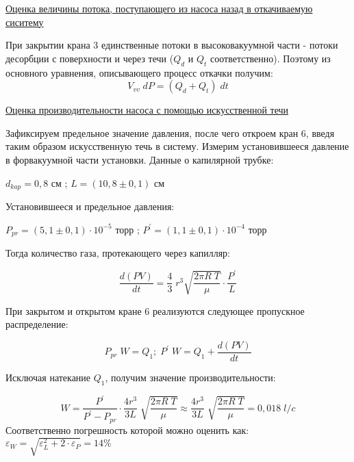 \documentclass{article}
\begin{document}
\begin{center}
    \raggedleft
    {
        \large{\underline{Оценка величины потока, поступающего из насоса назад в откачиваемую сиситему}}
    }
\end{center}

При закрытии крана 3 единственные потоки в высоковакуумной части - потоки десорбции с поверхности и через течи (\(Q_{d}\) и \(Q_{t}\) соответственно). Поэтому из основного уравнения, описывающего процесс откачки получим:
\begin{equation}
    V_{vv}\;dP = (Q_{d} + Q_{t})\;dt
\end{equation}

\begin{center}
    \raggedleft
    {
        \large{\underline{Оценка производительности насоса с помощью искусственной течи}}
    }
\end{center}

Зафиксируем предельное значение давления, после чего откроем кран 6, введя таким образом искусственную течь в систему. Измерим установившееся давление в форвакуумной части установки. Данные о капилярной трубке:

\begin{center}
    \(d_{kap} = 0,8\) см ; \; \(L = (10,8 \pm 0,1)\) см
\end{center}

Установившееся и предельное давления:

\begin{center}
    \(P_{pr} = (5,1 \pm 0,1) \cdot 10^{-5}\) торр ; \; \(P^{'} = (1,1 \pm 0,1) \cdot 10^{-4}\) торр
\end{center}

Тогда количество газа, протекающего через капилляр:

\begin{equation}
    \frac{d(PV)}{dt} = \frac{4}{3}\; r^{3} \sqrt{\frac{2\pi R\;T}{\mu}} \cdot \frac{P^{'}}{L}
\end{equation}

При закрытом и открытом кране 6 реализуются следующее пропускное распределение:

\begin{equation}
    P_{pr}\;W = Q_{1} ; \; P^{'}\;W = Q_{1} + \frac{d(PV)}{dt}
\end{equation}

Исключая натекание \(Q_{1}\), получим значение производительности:

\begin{equation}
    W = \frac{P^{'}}{P^{'} - P_{pr}} \cdot \frac{4 r^{3}}{3 L}\; \sqrt{\frac{2\pi R\;T}{\mu}} \approx \frac{4 r^{3}}{3 L}\; \sqrt{\frac{2\pi R\;T}{\mu}} = 0,018 \; l/c
\end{equation}
Соответственно погрешность которой можно оценить как: \(\varepsilon_{W} = \sqrt{\varepsilon_{L}^{2} + 2\cdot \varepsilon_{P}} = 14 \%\)
\end{document}
